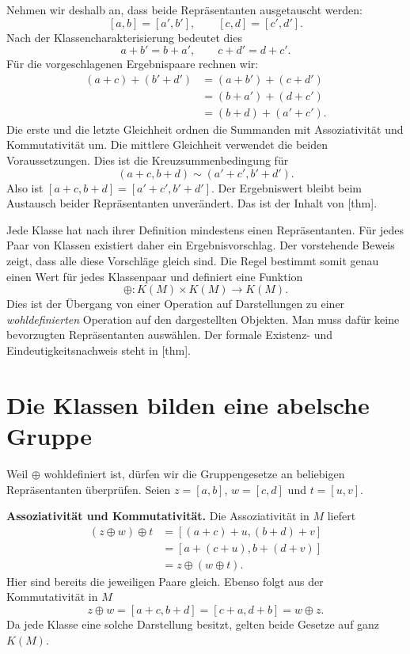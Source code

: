 Nehmen wir deshalb an, dass beide Repräsentanten ausgetauscht werden:
\[
  [a,b]=[a',b'],
  \qquad [c,d]=[c',d'].
\]
Nach der Klassencharakterisierung bedeutet dies
\[
  a+b'=b+a',
  \qquad c+d'=d+c'.
\]
Für die vorgeschlagenen Ergebnispaare rechnen wir:
\[
  \begin{aligned}
    (a+c)+(b'+d')
      &=(a+b')+(c+d')\\
      &=(b+a')+(d+c')\\
      &=(b+d)+(a'+c').
  \end{aligned}
\]
Die erste und die letzte Gleichheit ordnen die Summanden mit
Assoziativität und Kommutativität um. Die mittlere Gleichheit
verwendet die beiden Voraussetzungen. Dies ist die
Kreuzsummenbedingung für
\[
  (a+c,b+d)\sim(a'+c',b'+d').
\]
Also ist \([a+c,b+d]=[a'+c',b'+d']\). Der Ergebniswert
bleibt beim Austausch beider Repräsentanten unverändert.
Das ist der Inhalt von
[thm].

Jede Klasse hat nach ihrer Definition mindestens einen
Repräsentanten. Für jedes Paar von Klassen existiert daher ein
Ergebnisvorschlag. Der vorstehende Beweis zeigt, dass alle diese
Vorschläge gleich sind. Die Regel bestimmt somit genau einen Wert
für jedes Klassenpaar und definiert eine Funktion
\[
  \oplus\colon K(M)\times K(M)\longrightarrow K(M).
\]
Dies ist der Übergang von einer Operation auf Darstellungen zu
einer \emph{wohldefinierten} Operation auf den dargestellten
Objekten. Man muss dafür keine bevorzugten Repräsentanten
auswählen. Der formale Existenz- und Eindeutigkeitsnachweis steht
in [thm].

\par{}
\hypertarget{differences.reading.group}{}
\section*{Die Klassen bilden eine abelsche Gruppe}

Weil \(\oplus\) wohldefiniert ist, dürfen wir die
Gruppengesetze an beliebigen Repräsentanten überprüfen.
Seien \(z=[a,b]\), \(w=[c,d]\) und \(t=[u,v]\).

\medskip\noindent\textbf{Assoziativität und Kommutativität.}
Die Assoziativität in \(M\) liefert
\[
  \begin{aligned}
    (z\oplus w)\oplus t
      &=[(a+c)+u,(b+d)+v]\\
      &=[a+(c+u),b+(d+v)]\\
      &=z\oplus(w\oplus t).
  \end{aligned}
\]
Hier sind bereits die jeweiligen Paare gleich. Ebenso folgt aus
der Kommutativität in \(M\)
\[
  z\oplus w=[a+c,b+d]=[c+a,d+b]=w\oplus z.
\]
Da jede Klasse eine solche Darstellung besitzt, gelten beide
Gesetze auf ganz \(K(M)\).

